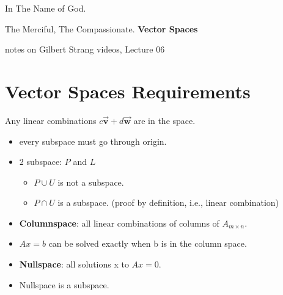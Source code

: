 \documentclass[a4paper,12pt]{article}
\begin{document}
\begin{center}
In The Name of God.

The Merciful, The Compassionate.
\vskip 1cm
{\Large\bfseries{Vector Spaces}}

\vskip 0.2cm
\tiny{notes on Gilbert Strang videos, Lecture 06}
\end{center}

\section{Vector Spaces Requirements}
Any linear combinations $c\vec{\mathbf{v}}+d\vec{\mathbf{w}}$ are in the space.

\begin{itemize}
	\item every subspace must go through origin.

	\item 2 subspace: $P$ and $L$
		\begin{itemize}
			\item $P \cup U$ is not a subspace.

			\item $P \cap U$ is a subspace. (proof by definition, i.e., linear combination)

		\end{itemize}

	\item \textbf{Columnspace}: all linear combinations of columns of $A_{m \times n}$.
	
	\item 	$Ax=b$ can be solved exactly when b is in the column space.
	
	\item \textbf{Nullspace}: all solutions x to $Ax=0$.
	
	\item  Nullspace is a subspace.

\end{itemize}
\end{document}
